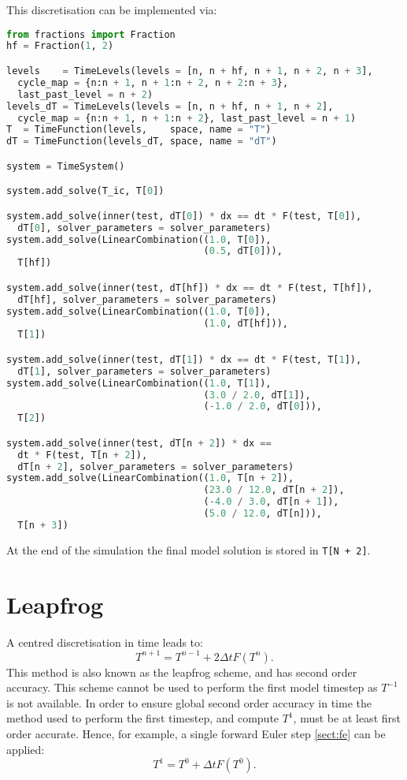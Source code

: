 \documentclass[a4paper]{book}
\begin{document}
This discretisation can be implemented via:
\begin{lstlisting}[language = python, frame = single, basicstyle=\footnotesize]
from fractions import Fraction
hf = Fraction(1, 2)

levels    = TimeLevels(levels = [n, n + hf, n + 1, n + 2, n + 3],
  cycle_map = {n:n + 1, n + 1:n + 2, n + 2:n + 3},
  last_past_level = n + 2)
levels_dT = TimeLevels(levels = [n, n + hf, n + 1, n + 2],
  cycle_map = {n:n + 1, n + 1:n + 2}, last_past_level = n + 1)
T  = TimeFunction(levels,    space, name = "T")
dT = TimeFunction(levels_dT, space, name = "dT")

system = TimeSystem()

system.add_solve(T_ic, T[0])

system.add_solve(inner(test, dT[0]) * dx == dt * F(test, T[0]),
  dT[0], solver_parameters = solver_parameters)
system.add_solve(LinearCombination((1.0, T[0]),
                                   (0.5, dT[0])),
  T[hf])

system.add_solve(inner(test, dT[hf]) * dx == dt * F(test, T[hf]),
  dT[hf], solver_parameters = solver_parameters)
system.add_solve(LinearCombination((1.0, T[0]),
                                   (1.0, dT[hf])),
  T[1])

system.add_solve(inner(test, dT[1]) * dx == dt * F(test, T[1]),
  dT[1], solver_parameters = solver_parameters)
system.add_solve(LinearCombination((1.0, T[1]),
                                   (3.0 / 2.0, dT[1]),
                                   (-1.0 / 2.0, dT[0])),
  T[2])

system.add_solve(inner(test, dT[n + 2]) * dx ==
  dt * F(test, T[n + 2]),
  dT[n + 2], solver_parameters = solver_parameters)
system.add_solve(LinearCombination((1.0, T[n + 2]),
                                   (23.0 / 12.0, dT[n + 2]),
                                   (-4.0 / 3.0, dT[n + 1]),
                                   (5.0 / 12.0, dT[n])),
  T[n + 3])
\end{lstlisting}
At the end of the simulation the final model solution is stored in
\verb=T[N + 2]=.

\section{Leapfrog}

A centred discretisation in time leads to:
\begin{equation}
  T^{n + 1} = T^{n - 1} + 2 \Delta t F( T^n ).
\end{equation}
This method is also known as the leapfrog scheme, and has second order accuracy.
This scheme cannot be used to perform the first model timestep as $T^{-1}$ is
not available. In order to ensure global second order accuracy in time the
method used to perform the first timestep, and compute $T^1$, must be at least
first order accurate. Hence, for example, a single forward Euler step
\ref{sect:fe} can be applied:
\begin{equation}
  T^1 = T^0 + \Delta t F(T^0).
\end{equation}
\end{document}
